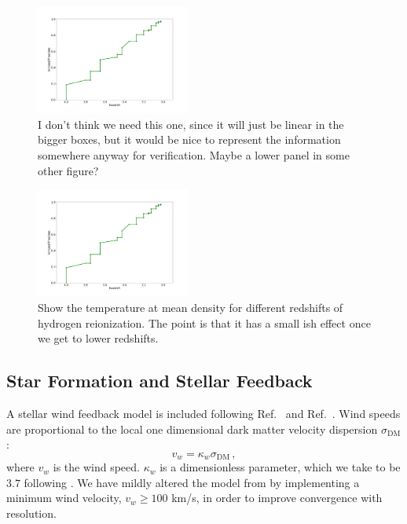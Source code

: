 \documentclass[a4paper,11pt]{article}
\begin{document}
\begin{figure}
\includegraphics[width=0.45\textwidth]{figures/HeIonFrac.pdf}
 \caption{I don't think we need this one, since it will just be linear in the bigger boxes, but it would be nice to represent the information somewhere anyway for verification. Maybe a lower panel in some other figure?}
 \label{fig:heliumionizationfrac}
\end{figure}

\begin{figure}
\includegraphics[width=0.45\textwidth]{figures/HeIonFrac.pdf}
 \caption{Show the temperature at mean density for different redshifts of hydrogen reionization. The point is that it has a small ish effect once we get to lower redshifts.}
 \label{fig:hydrogentempdens}
\end{figure}

\subsection{Star Formation and Stellar Feedback}

A stellar wind feedback model is included following Ref.~\citep{Okamoto:2010} and Ref.~\cite{Bird:2022}. Wind speeds are proportional to the local one dimensional dark matter velocity dispersion $\sigma_\mathrm{DM}$:
\begin{equation}
v_w = \kappa_w \sigma_\mathrm{DM} \,,
\end{equation}
where $v_w$ is the wind speed. $\kappa_w$ is a dimensionless parameter, which we take to be $3.7$ following \cite{Vogelsberger:2013}. We have mildly altered the model from \cite{Bird:2022} by implementing a minimum wind velocity, $v_w \geq 100$ km/s, in order to improve convergence with resolution.
\end{document}
